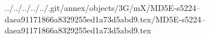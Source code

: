 ../../../../../.git/annex/objects/3G/mX/MD5E-s5224--daea91171866a8329255ed1a73d5abd9.tex/MD5E-s5224--daea91171866a8329255ed1a73d5abd9.tex